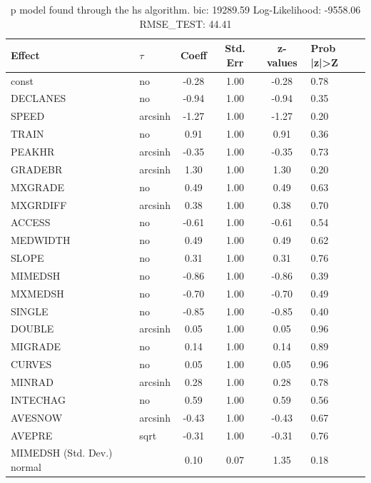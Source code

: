 \begin{table}
	\caption{p model found through the hs algorithm. bic: 19289.59 Log-Likelihood: -9558.06 RMSE_TEST: 44.41}
	\begin{center}
		\begin{tabular}{|l|l|c|c|c|l|}
			\hline
			Effect & $\tau$ & Coeff & Std. Err & z-values & Prob |z|>Z \\
			\hline
			const & no & -0.28 & 1.00 & -0.28 & 0.78 \\
			\hline
			DECLANES & no & -0.94 & 1.00 & -0.94 & 0.35 \\
			\hline
			SPEED & arcsinh & -1.27 & 1.00 & -1.27 & 0.20 \\
			\hline
			TRAIN & no & 0.91 & 1.00 & 0.91 & 0.36 \\
			\hline
			PEAKHR & arcsinh & -0.35 & 1.00 & -0.35 & 0.73 \\
			\hline
			GRADEBR & arcsinh & 1.30 & 1.00 & 1.30 & 0.20 \\
			\hline
			MXGRADE & no & 0.49 & 1.00 & 0.49 & 0.63 \\
			\hline
			MXGRDIFF & arcsinh & 0.38 & 1.00 & 0.38 & 0.70 \\
			\hline
			ACCESS & no & -0.61 & 1.00 & -0.61 & 0.54 \\
			\hline
			MEDWIDTH & no & 0.49 & 1.00 & 0.49 & 0.62 \\
			\hline
			SLOPE & no & 0.31 & 1.00 & 0.31 & 0.76 \\
			\hline
			MIMEDSH & no & -0.86 & 1.00 & -0.86 & 0.39 \\
			\hline
			MXMEDSH & no & -0.70 & 1.00 & -0.70 & 0.49 \\
			\hline
			SINGLE & no & -0.85 & 1.00 & -0.85 & 0.40 \\
			\hline
			DOUBLE & arcsinh & 0.05 & 1.00 & 0.05 & 0.96 \\
			\hline
			MIGRADE & no & 0.14 & 1.00 & 0.14 & 0.89 \\
			\hline
			CURVES & no & 0.05 & 1.00 & 0.05 & 0.96 \\
			\hline
			MINRAD & arcsinh & 0.28 & 1.00 & 0.28 & 0.78 \\
			\hline
			INTECHAG & no & 0.59 & 1.00 & 0.59 & 0.56 \\
			\hline
			AVESNOW & arcsinh & -0.43 & 1.00 & -0.43 & 0.67 \\
			\hline
			AVEPRE & sqrt & -0.31 & 1.00 & -0.31 & 0.76 \\
			\hline
			MIMEDSH (Std. Dev.) normal &  & 0.10 & 0.07 & 1.35 & 0.18 \\

\end{tabular}
\end{center}
\end{table}
